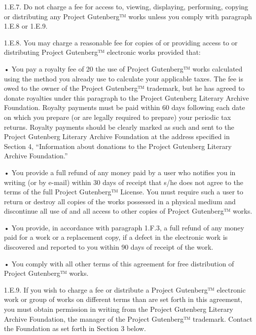 1.E.7. Do not charge a fee for access to, viewing, displaying,
performing, copying or distributing any Project Gutenberg™ works
unless you comply with paragraph 1.E.8 or 1.E.9.

1.E.8. You may charge a reasonable fee for copies of or providing
access to or distributing Project Gutenberg™ electronic works
provided that:

    • You pay a royalty fee of 20%
        the use of Project Gutenberg™ works calculated using the method
        you already use to calculate your applicable taxes. The fee is owed
        to the owner of the Project Gutenberg™ trademark, but he has
        agreed to donate royalties under this paragraph to the Project
        Gutenberg Literary Archive Foundation. Royalty payments must be paid
        within 60 days following each date on which you prepare (or are
        legally required to prepare) your periodic tax returns. Royalty
        payments should be clearly marked as such and sent to the Project
        Gutenberg Literary Archive Foundation at the address specified in
        Section 4, “Information about donations to the Project Gutenberg
        Literary Archive Foundation.”

    • You provide a full refund of any money paid by a user who notifies
        you in writing (or by e-mail) within 30 days of receipt that s/he
        does not agree to the terms of the full Project Gutenberg™
        License. You must require such a user to return or destroy all
        copies of the works possessed in a physical medium and discontinue
        all use of and all access to other copies of Project Gutenberg™
        works.

    • You provide, in accordance with paragraph 1.F.3, a full refund of
        any money paid for a work or a replacement copy, if a defect in the
        electronic work is discovered and reported to you within 90 days of
        receipt of the work.

    • You comply with all other terms of this agreement for free
        distribution of Project Gutenberg™ works.


1.E.9. If you wish to charge a fee or distribute a Project
Gutenberg™ electronic work or group of works on different terms than
are set forth in this agreement, you must obtain permission in writing
from the Project Gutenberg Literary Archive Foundation, the manager of
the Project Gutenberg™ trademark. Contact the Foundation as set
forth in Section 3 below.

